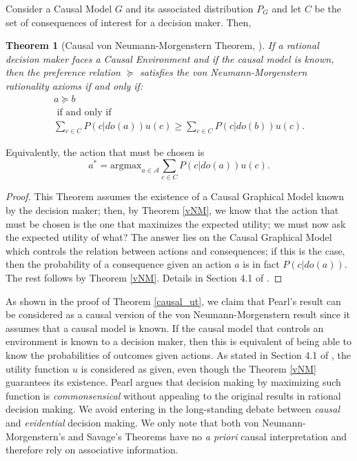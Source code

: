 \documentclass[review]{elsarticle}
\newtheorem{theorem}{Theorem}
\begin{document}
Consider a Causal Model $G$ and its associated distribution $P_G$ and let $C$ be the set of consequences of interest for a decision maker. Then,
\begin{theorem}[Causal von Neumann-Morgenstern Theorem, \cite{pearl2009causality}]{\label{causal_ut}}
If a rational decision maker faces a Causal Environment and if the causal model is known, then the preference relation $\succeq$ satisfies the von Neumann-Morgenstern rationality axioms if and only if:
\begin{eqnarray*}
&a \succeq b&\\
& \textrm{ if and only if }&\\
 &\sum_{c \in C} P(c | do(a))u(c) \geq \sum_{c \in C} P(c | do(b))u(c).&
\end{eqnarray*} 
\end{theorem}
Equivalently, the action that must be chosen is 
\begin{equation}
a^\ast = \textrm{argmax}_{a \in \mathcal{A}} \sum_{c \in C} P(c | do(a))u(c).
\end{equation}
\begin{proof}
This Theorem assumes the existence of a Causal Graphical Model known by the decision maker; then, by Theorem \ref{vNM}, we know that the action that must be chosen is the one that maximizes the expected utility; we must now ask the expected utility of what? The answer lies on the Causal Graphical Model which controls the relation between actions and consequences; if this is the case, then the probability of a consequence given an action $a$ is in fact $P(c|do(a))$. The rest follows by Theorem \ref{vNM}. Details in Section 4.1 of \cite{pearl2009causality}.
\end{proof}

As shown in the proof of Theorem \ref{causal_ut}, we claim that Pearl's result can be considered as a causal version of the von Neumann-Morgenstern result since it assumes that a causal model is known. If the causal model that controls an environment is known to a decision maker, then this is equivalent of being able to know the probabilities of outcomes given actions. As stated in Section 4.1 of \cite{pearl2009causality}, the utility function $u$ is considered as given, even though the Theorem \ref{vNM} guarantees its existence. Pearl argues that decision making by maximizing such function is \textit{commonsensical} without appealing to the original results in rational decision making. We avoid entering in the long-standing debate between \textit{causal} and \textit{evidential} decision making. We only note that both von Neumann-Morgenstern's and Savage's Theorems have no {\em a priori} causal interpretation and therefore rely on associative information.
\end{document}
